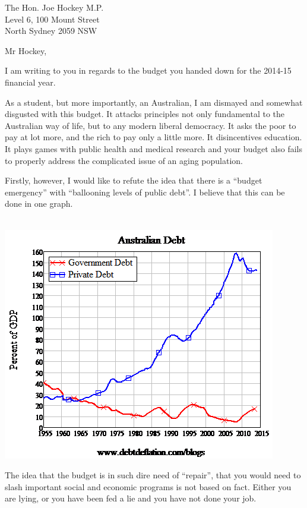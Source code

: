 \documentclass{letter}
\begin{document}
\begin{letter}{The Hon. Joe Hockey M.P. \\ Level 6, 100 Mount Street \\ North Sydney 2059 NSW }

\opening{Mr Hockey,}

I am writing to you in regards to the budget you handed down for the 2014-15 financial year.

As a student, but more importantly, an Australian, I am dismayed and somewhat disgusted with this budget.
It attacks principles not only fundamental to the Australian way of life, 
but to any modern liberal democracy. It asks the poor to pay at lot more,
and the rich to pay only a little more. It disincentives education. It plays games with public health
and medical research and your budget also fails to properly address the complicated issue
of an aging population. 

Firstly, however, I would like to refute the idea that there is a ``budget emergency'' with
``ballooning levels of public debt''. 
I believe that this can be done in one graph.

\begin{centering}
	\ \ \ \ \ \ \ \ \ \ \ \ \ \ \ \ \ \ \includegraphics[scale=0.7]{public-private-debt}
\end{centering}

The idea that the budget is in such dire need of ``repair'', that you would need
to slash important social and economic programs is not based on fact. Either you are lying,
or you have been fed a lie and you have not done your job.



\end{letter}
\end{document}
